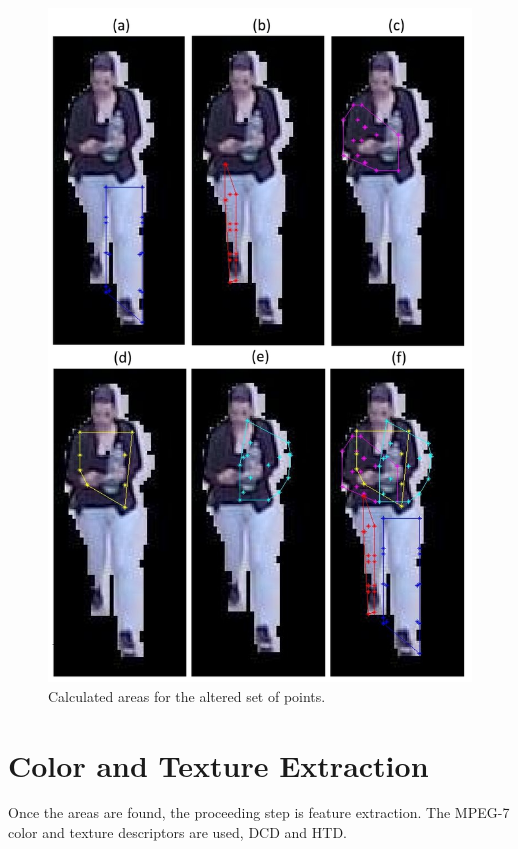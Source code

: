 \documentclass[titlepage,12pt,a4paper,times]{book}
\begin{document}
\begin{figure}[!h]
\centering
\includegraphics[scale=0.63]{images/3_3_fig4_final.jpg}
\caption{Calculated areas for the altered set of points.}
\label{fig:mcach}
\end{figure}
\FloatBarrier

\section{Color and Texture Extraction}
\label{chap3:sec:cte}
Once the areas are found, the proceeding step is feature extraction. The
\ac{MPEG-7} color and texture descriptors are used, \ac{DCD} and \ac{HTD}.
\end{document}
